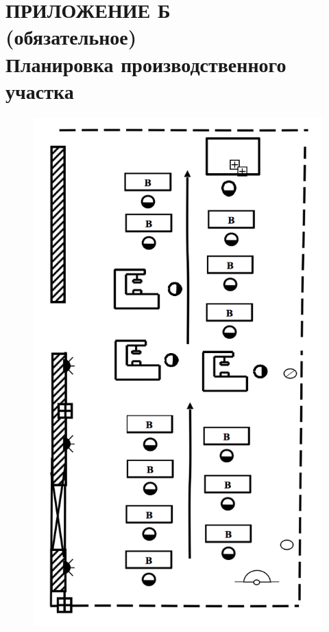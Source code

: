 \section*{ПРИЛОЖЕНИЕ Б \\
  (обязательное) \\
  Планировка производственного участка}

\label{sec:appendix_b}

\pagestyle{fancy}
\fancyhf{}  %
\fancyfoot[R]{\thepage}
\renewcommand{\headrulewidth}{0pt}
\renewcommand{\footrulewidth}{0pt}

\label{sec:appendix_a}
\begin{figure}[h!]
  \centering
  \includegraphics[width=0.7\linewidth]{pic/plan}
  \label{pic:plan}
\end{figure}

\setlength{\headheight}{10mm}
\setlength{\headsep}{\baselineskip}

\thispagestyle{plain}

\setcounter{section}{2}
\setcounter{figure}{0}
\setcounter{table}{0}
\setcounter{lstlisting}{0}